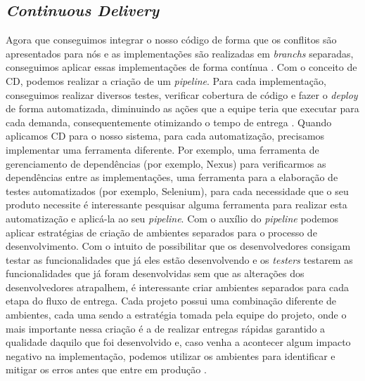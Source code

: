       \subsection{\textit{Continuous Delivery}}
        Agora que conseguimos integrar o nosso código de forma que os conflitos são
        apresentados para nós e as implementações são realizadas em \textit{branchs}
        separadas, conseguimos aplicar essas implementações de forma contínua
        \cite{TheDevOpsHandbook}. Com o conceito de CD, podemos realizar a criação
        de um \textit{pipeline}. Para cada implementação, conseguimos realizar
        diversos testes, verificar cobertura de código e fazer o \textit{deploy}
        de forma automatizada, diminuindo as ações que a equipe teria que executar
        para cada demanda, consequentemente otimizando o tempo de entrega
        \cite{ContinuousDelivery}. Quando aplicamos CD para o nosso sistema,
        para cada automatização, precisamos implementar uma ferramenta diferente.
        Por exemplo, uma ferramenta de gerenciamento de dependências (por exemplo,
        Nexus) para verificarmos as dependências entre as implementações, uma ferramenta
        para a elaboração de testes automatizados (por exemplo, Selenium), para
        cada necessidade que o seu produto necessite é interessante pesquisar alguma
        ferramenta para realizar esta automatização e aplicá-la ao seu \textit{
        pipeline}. \newline
        Com o auxílio do \textit{pipeline} podemos aplicar estratégias de criação
        de ambientes separados para o processo de desenvolvimento. Com o intuito de
        possibilitar que os desenvolvedores consigam testar as funcionalidades que
        já eles estão desenvolvendo e os \textit{testers} testarem as funcionalidades
        que já foram desenvolvidas sem que as alterações dos desenvolvedores
        atrapalhem, é interessante criar ambientes separados para cada etapa do
        fluxo de entrega. \newline
        Cada projeto possui uma combinação diferente de ambientes, cada uma sendo
        a estratégia tomada pela equipe do projeto, onde o mais importante nessa
        criação é a de realizar entregas rápidas garantido a qualidade daquilo
        que foi desenvolvido e, caso venha a acontecer algum impacto negativo na
        implementação, podemos utilizar os ambientes para identificar e mitigar
        os erros antes que entre em produção \cite{TheDevOpsHandbook}. \newline

